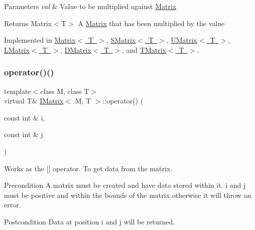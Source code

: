 \begin{DoxyParams}{Parameters}
{\em val} & Value to be multiplied against \mbox{\hyperlink{class_matrix}{Matrix}} \\
\hline
\end{DoxyParams}
\begin{DoxyReturn}{Returns}
Matrix$<$\+T$>$ A \mbox{\hyperlink{class_matrix}{Matrix}} that has been multiplied by the value 
\end{DoxyReturn}


Implemented in \mbox{\hyperlink{class_matrix_a9b987f07fb3d4fcf2b038cbfd6615650}{Matrix$<$ T $>$}}, \mbox{\hyperlink{class_s_matrix_aa01badd1e585fe9c362d21bc79925c80}{S\+Matrix$<$ T $>$}}, \mbox{\hyperlink{class_u_matrix_a7b1875cfc49b374875dac2a58948f3ac}{U\+Matrix$<$ T $>$}}, \mbox{\hyperlink{class_l_matrix_ac8df9082c434b41a98d26defb95ea388}{L\+Matrix$<$ T $>$}}, \mbox{\hyperlink{class_d_matrix_a75ef39fe66d72426b7a84b91bfc136c4}{D\+Matrix$<$ T $>$}}, and \mbox{\hyperlink{class_t_matrix_a4d6a92d764a31d148199dc55298771db}{T\+Matrix$<$ T $>$}}.

\mbox{\label{class_i_matrix_a1e4246d163aaca1b224dec8839645ea9}} 
\subsubsection{\texorpdfstring{operator()()}{operator()()}\hspace{0.1cm}{\footnotesize\ttfamily [1/2]}}
{\footnotesize\ttfamily template$<$class M, class T$>$ \\
virtual T\& \mbox{\hyperlink{class_i_matrix}{I\+Matrix}}$<$ M, T $>$\+::operator() (\begin{DoxyParamCaption}\item[{const int \&}]{i,  }\item[{const int \&}]{j }\end{DoxyParamCaption})\hspace{0.3cm}{\ttfamily [pure virtual]}}



Works as the \mbox{[}\mbox{]} operator. To get data from the matrix. 

\begin{DoxyPrecond}{Precondition}
A matrix must be created and have data stored within it. i and j must be positive and within the bounds of the matrix otherwise it will throw an error. 
\end{DoxyPrecond}
\begin{DoxyPostcond}{Postcondition}
Data at position i and j will be returned.
\end{DoxyPostcond}

